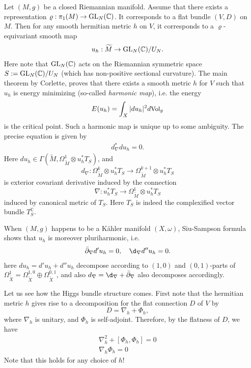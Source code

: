 \documentclass[english]{amsproc}
\theoremstyle{plain}
\theoremstyle{definition}
\theoremstyle{remark}
\theoremstyle{plain}
\numberwithin{equation}{thm} %
\newcommand{\bC}{\mathbb{C}}
\def\db{\bar{\partial}}
\def\vol{\text{\small  Vol}}
\newcommand{\GL}{{\rm GL}}
\begin{document}
Let $(M,g)$ be a closed Riemannian manifold. Assume that there exists a representation $\varrho:\pi_1(M)\to \GL_N(\bC)$. It corresponds to a flat bundle $(V,D)$ on $M$. Then for any smooth hermitian metric $h$ on $V$, it corresponds to a $\varrho$-equivariant smooth map 
$$
u_h:\widetilde{M}\to \GL_N(\bC)/U_N.
$$
Here note that $\GL_N(\bC)$ acts on the Riemannian symmetric space $S:=\GL_N(\bC)/U_N$ (which has non-positive sectional curvature). The main theorem by Corlette, proves that there exists a smooth metric $h$ for $V$ such that $u_h$ is energy minimizing (so-called \emph{harmonic map}), i.e. the energy 
$$
E(u_h)=\int_{X}|du_h|^2d\vol_g
$$
is the critical point. Such a harmonic map is unique up to some ambiguity. The precise equation is given by
\begin{align}
	d_\nabla^*du_h=0.
\end{align}
Here $du_h\in \Gamma(\widetilde{M}, \Omega_{\widetilde{M}}^1\otimes u_h^*T_S)$, and 
$$
d_\nabla:\Omega_{\widetilde{M}}^k\otimes u_h^*T_S \to \Omega_{\widetilde{M}}^{k+1}\otimes u_h^*T_S 
$$
is exterior covariant derivative induced by the connection 
$$
\nabla:u_h^*T_S\to \Omega_{\widetilde{M}}^1\otimes u_h^*T_S
$$
induced by canonical metric of $T_S$. Here $T_S$ is indeed the complexified vector bundle $T_{S}^\bC$. 


When $(M,g)$ happens to be a K\"ahler manifold $(X,\omega)$, Siu-Sampson formula shows that $u_h$ is moreover pluriharmonic, i.e.
\begin{align}\label{eq:pluriharmonic}
	\db_\nabla d' u_h=0,\quad \d_\nabla d''u_h=0.
\end{align} 
here $du_h=d'u_h+d''u_h$ decompose according to $(1,0)$ and $(0,1)$-parts of $\Omega_{\widetilde{X}}^1=\Omega_{\widetilde{X}}^{1,0}\oplus \Omega_{\widetilde{X}}^{0,1}$, and also  $d_\nabla=\d_\nabla+\db_\nabla$ also decomposes accordingly. 

Let us see how the Higgs bundle structure comes. First note that the hermitian metric $h$ gives rise to a decomposition  for the flat connection $D$ of $V$ by
$$
D=\nabla_h+\Phi_h,
$$
where $\nabla_h$ is unitary, and $\Phi_h$ is self-adjoint.  Therefore, by the flatness of $D$, we have
\begin{align}\nonumber
	\nabla_h^2+[\Phi_h,\Phi_h]=0\\
	\nabla_h\Phi_h=0\label{eq:flat}
\end{align} 
Note that this holds for any choice of $h$!   
\end{document}
